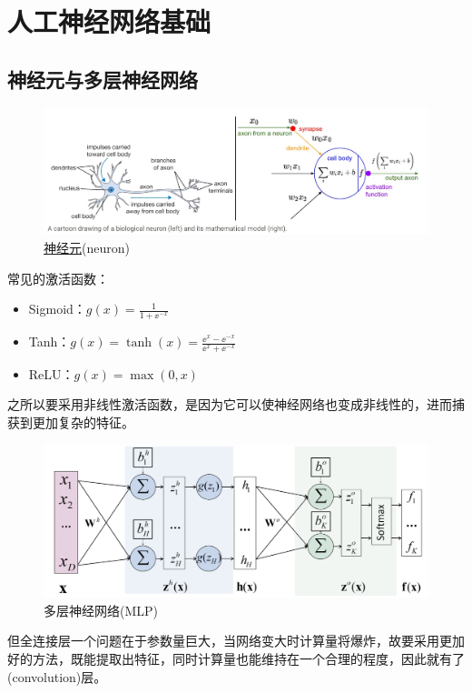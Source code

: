 
\section{人工神经网络基础} %
\subsection{神经元与多层神经网络}
\begin{figure}[H]
\centering
\includegraphics[width=0.9\linewidth]{fig/neuron_model.png}
\caption{\href{http://cs231n.github.io/neural-networks-1/}{神经元}(neuron)}
\end{figure}

常见的激活函数：
\begin{itemize}
    \item Sigmoid：$g(x)=\frac{1}{1+\ee^{-x}}$
    \item Tanh：$g(x)=\tanh(x)=\frac{\ee^{x}-\ee^{-x}}{\ee^{x}+\ee^{-x}}$
    \item ReLU：$g(x)=\max(0,x)$
\end{itemize}
之所以要采用非线性激活函数，是因为它可以使神经网络也变成非线性的，进而捕获到更加复杂的特征。

\begin{figure}[H]
\centering
\includegraphics[width=0.8\linewidth]{fig/mlp.png}
\caption{多层神经网络(MLP)}
\end{figure}

但全连接层一个问题在于参数量巨大，当网络变大时计算量将爆炸，故要采用更加好的方法，既能提取出特征，同时计算量也能维持在一个合理的程度，因此就有了(convolution)层。

